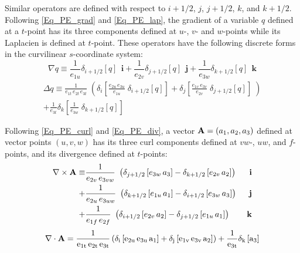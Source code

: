 \documentclass[NEMO_book]{subfiles}
\begin{document}
Similar operators are defined with respect to $i+1/2$, $j$, $j+1/2$, $k$, and 
$k+1/2$. Following \eqref{Eq_PE_grad} and \eqref{Eq_PE_lap}, the gradient of a 
variable $q$ defined at a $t$-point has its three components defined at $u$-, $v$- 
and $w$-points while its Laplacien is defined at $t$-point. These operators have 
the following discrete forms in the curvilinear $s$-coordinate system:
\begin{equation} \label{Eq_DOM_grad}
\nabla q\equiv 	\frac{1}{e_{1u} } \delta _{i+1/2 } [q] \;\,\mathbf{i}
		+	\frac{1}{e_{2v} } \delta _{j+1/2 } [q] \;\,\mathbf{j}
		+	\frac{1}{e_{3w}} \delta _{k+1/2} [q] \;\,\mathbf{k}
\end{equation}
\begin{multline} \label{Eq_DOM_lap}
\Delta q\equiv \frac{1}{e_{1t}\,e_{2t}\,e_{3t} }
       \;\left(          \delta_i  \left[ \frac{e_{2u}\,e_{3u}} {e_{1u}} \;\delta_{i+1/2} [q] \right]
+                        \delta_j  \left[ \frac{e_{1v}\,e_{3v}}  {e_{2v}} \;\delta_{j+1/2} [q] \right] \;  \right)		\\
+\frac{1}{e_{3t}} \delta_k \left[ \frac{1}{e_{3w} }                     \;\delta_{k+1/2} [q] \right]
\end{multline}

Following \eqref{Eq_PE_curl} and \eqref{Eq_PE_div}, a vector ${\rm {\bf A}}=\left( a_1,a_2,a_3\right)$ 
defined at vector points $(u,v,w)$ has its three curl components defined at $vw$-, $uw$, 
and $f$-points, and its divergence defined at $t$-points:
\begin{eqnarray}  \label{Eq_DOM_curl}
 \nabla \times {\rm{\bf A}}\equiv &
      \frac{1}{e_{2v}\,e_{3vw} } \ \left( \delta_{j +1/2} \left[e_{3w}\,a_3 \right] -\delta_{k+1/2} \left[e_{2v} \,a_2 \right] \right)  &\ \mathbf{i} \\ 
 +& \frac{1}{e_{2u}\,e_{3uw}} \ \left( \delta_{k+1/2} \left[e_{1u}\,a_1  \right] -\delta_{i +1/2} \left[e_{3w}\,a_3 \right] \right)  &\ \mathbf{j} \\
 +& \frac{1}{e_{1f} \,e_{2f}    } \ \left( \delta_{i +1/2} \left[e_{2v}\,a_2  \right] -\delta_{j +1/2} \left[e_{1u}\,a_1 \right] \right)  &\ \mathbf{k}
 \end{eqnarray}
\begin{equation} \label{Eq_DOM_div}
\nabla \cdot \rm{\bf A}=\frac{1}{e_{1t}\,e_{2t}\,e_{3t}}\left( \delta_i \left[e_{2u}\,e_{3u}\,a_1 \right]
                                                                                         +\delta_j \left[e_{1v}\,e_{3v}\,a_2 \right] \right)+\frac{1}{e_{3t} }\delta_k \left[a_3 \right]
\end{equation}
\end{document}
